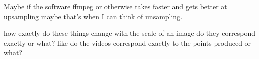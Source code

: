 Maybe if the software ffmpeg or otherwise takes faster and gets better at upsampling maybe that's when I can think of unsampling.

how exactly do these things change with the scale of an image 
do they correspond exactly or what? like do the videos correspond exactly to the points produced or what?
